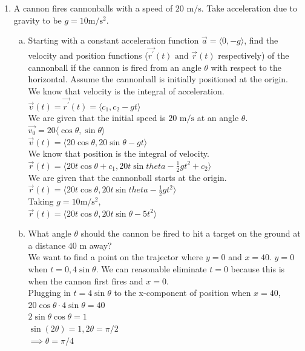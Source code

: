 \begin{enumerate}
	\item A cannon fires cannonballs with a speed of $20\text{ m}/\text{s}$. Take acceleration due to gravity to be $g=10\text{m}/\text{s}^2$.
	\begin{enumerate}[a.]
		\item Starting with a constant acceleration function $\vec{a}=\langle 0,-g\rangle$, find the velocity and position functions ($\vec{r^\prime}(t)\text{ and }\vec{r}(t)$ respectively) of the cannonball if the cannon is fired from an angle $\theta$ with respect to the horizontal. Assume the cannonball is initially positioned at the origin.\\
		\indent
		We know that velocity is the integral of acceleration.\\
		$\vec{v}(t)=\vec{r^\prime}(t)=\langle c_1,c_2-gt\rangle$\\
		We are given that the initial speed is $20\text{ m}/\text{s}$ at an angle $\theta$.\\
		$\vec{v_0}=20\langle\cos{\theta},\sin{\theta}\rangle$\\
		$\vec{v}(t)=\langle 20\cos{\theta},20\sin{\theta}-gt\rangle$\\
		We know that position is the integral of velocity.\\
		$\vec{r}(t)=\langle 20t\cos{\theta}+c_1,20t\sin{theta}-\frac{1}{2}gt^2+c_2\rangle$\\
		We are given that the cannonball starts at the origin.\\
		$\vec{r}(t)=\langle 20t\cos{\theta}, 20t\sin{theta}-\frac{1}{2}gt^2\rangle$\\
		Taking $g=10\text{m}/\text{s}^2$,\\
		$\vec{r}(t)=\langle 20t\cos{\theta},20t\sin{\theta}-5t^2\rangle$\\
			
		\item What angle $\theta$ should the cannon be fired to hit a target on the ground at a distance $40\text{ m}$ away?\\
		\indent
		We want to find a point on the trajector where $y=0$ and $x=40$.
		$y=0$ when $t=0,4\sin{\theta}$. We can reasonable eliminate $t=0$ because this is when the cannon first fires and $x=0$.\\
		Plugging in $t=4\sin{\theta}$ to the x-component of position when $x=40$,\\
		$20\cos{\theta}\cdot 4\sin{\theta}=40$\\
		$2\sin{\theta}\cos{\theta}=1$\\
		$\sin{(2\theta)}=1, 2\theta=\pi/2$\\
		$\implies \theta=\pi/4$\\
	\end{enumerate}
	

\end{enumerate}
